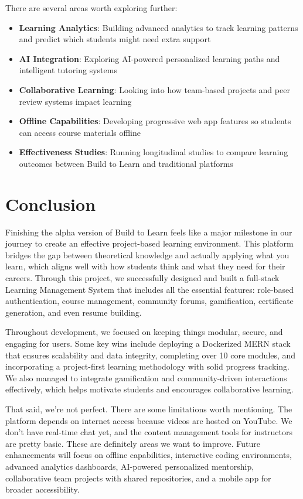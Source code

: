 \documentclass[final,3p,times,twocolumn]{elsarticle}
\begin{document}
There are several areas worth exploring further:

\begin{itemize}
    \item \textbf{Learning Analytics}: Building advanced analytics to track learning patterns and predict which students might need extra support
    \item \textbf{AI Integration}: Exploring AI-powered personalized learning paths and intelligent tutoring systems
    \item \textbf{Collaborative Learning}: Looking into how team-based projects and peer review systems impact learning
    \item \textbf{Offline Capabilities}: Developing progressive web app features so students can access course materials offline
    \item \textbf{Effectiveness Studies}: Running longitudinal studies to compare learning outcomes between Build to Learn and traditional platforms
\end{itemize}

\section{Conclusion}

Finishing the alpha version of Build to Learn feels like a major milestone in our journey to create an effective project-based learning environment. This platform bridges the gap between theoretical knowledge and actually applying what you learn, which aligns well with how students think and what they need for their careers. Through this project, we successfully designed and built a full-stack Learning Management System that includes all the essential features: role-based authentication, course management, community forums, gamification, certificate generation, and even resume building.

Throughout development, we focused on keeping things modular, secure, and engaging for users. Some key wins include deploying a Dockerized MERN stack that ensures scalability and data integrity, completing over 10 core modules, and incorporating a project-first learning methodology with solid progress tracking. We also managed to integrate gamification and community-driven interactions effectively, which helps motivate students and encourages collaborative learning.

That said, we're not perfect. There are some limitations worth mentioning. The platform depends on internet access because videos are hosted on YouTube. We don't have real-time chat yet, and the content management tools for instructors are pretty basic. These are definitely areas we want to improve. Future enhancements will focus on offline capabilities, interactive coding environments, advanced analytics dashboards, AI-powered personalized mentorship, collaborative team projects with shared repositories, and a mobile app for broader accessibility.
\end{document}
